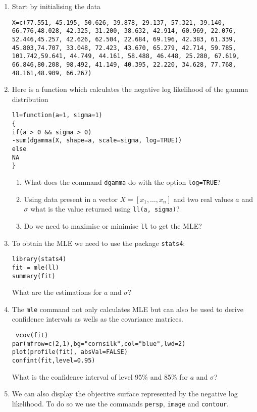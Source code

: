 \documentclass[a4paper,10pt]{article}
\begin{document}
\begin{enumerate} 
 \item Start by initialising the data 
\begin{lstlisting}
X=c(77.551, 45.195, 50.626, 39.878, 29.137, 57.321, 39.140, 
66.776,48.028, 42.325, 31.200, 38.632, 42.914, 60.969, 22.076, 
52.446,45.257, 42.626, 62.504, 22.684, 69.196, 42.383, 61.339, 
45.803,74.707, 33.048, 72.423, 43.670, 65.279, 42.714, 59.785, 
101.742,59.641, 44.749, 44.161, 58.488, 46.448, 25.280, 67.619, 
66.846,80.208, 98.492, 41.149, 40.395, 22.220, 34.628, 77.768, 
48.161,48.909, 66.267)
\end{lstlisting}
\item Here is a function which calculates the negative log likelihood of the gamma distribution

\begin{lstlisting}
ll=function(a=1, sigma=1)
{
if(a > 0 && sigma > 0)
-sum(dgamma(X, shape=a, scale=sigma, log=TRUE))
else
NA
}
\end{lstlisting}
\begin{enumerate}
\item What does the command \texttt{dgamma} do with the option \texttt{log=TRUE}? 
\item Using data present in a vector $X = [x_1, \ldots, x_n]$ and two real values $a$ and $\sigma$ what is the value returned using \texttt{ll(a, sigma)}?
\item Do we need to maximise or minimise \texttt{ll} to get the MLE? 
\end{enumerate}
\item To obtain the MLE we need to use the package \texttt{stats4}: 
\begin{lstlisting}
library(stats4)
fit = mle(ll)
summary(fit)
\end{lstlisting}
What are the estimations for $a$ and $\sigma$? 
\item The \texttt{mle} command not only calculates MLE but can also be used to derive confidence intervals as wells as the covariance matrices. 
\begin{lstlisting}
 vcov(fit)
par(mfrow=c(2,1),bg="cornsilk",col="blue",lwd=2)
plot(profile(fit), absVal=FALSE)
confint(fit,level=0.95)
\end{lstlisting}
What is the confidence interval of level 95\% and 85\% for $a$ and $\sigma$? 
\item We can also display the objective surface represented by the negative log likelihood. To do so we use the commands \texttt{persp}, \texttt{image} and \texttt{contour}. 


\end{enumerate}
\end{document}
